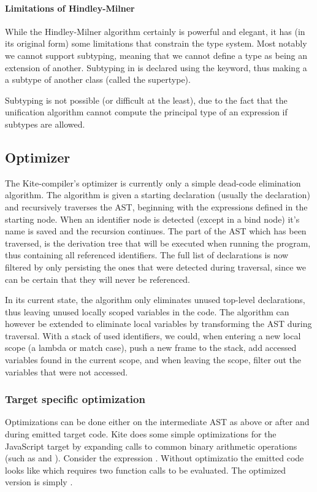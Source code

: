 \paragraph{Limitations of Hindley-Milner}
While the Hindley-Milner algorithm certainly is powerful and elegant, it has (in its original form) some limitations that constrain the type system. Most notably we cannot support subtyping, meaning that we cannot define a type as being an extension of another. Subtyping in  is declared using the  keyword, thus making a  a subtype of another class (called the supertype).

Subtyping is not possible (or difficult at the least), due to the fact that the unification algorithm cannot compute the principal type of an expression if subtypes are allowed.

\subsection{Optimizer}
\label{sec:impl-optimizer}
The Kite-compiler's optimizer is currently only a simple dead-code elimination algorithm. The algorithm is given a starting declaration (usually the  declaration) and recursively traverses the AST, beginning with the expressions defined in the starting node. When an identifier node is detected (except in a bind node) it's name is saved and the recursion continues. The part of the AST which has been traversed, is the derivation tree that will be executed when running the program, thus containing all referenced identifiers. The full list of declarations is now filtered by only persisting the ones that were detected during traversal, since we can be certain that they will never be referenced.

In its current state, the algorithm only eliminates unused top-level declarations, thus leaving unused locally scoped variables in the code. The algorithm can however be extended to eliminate local variables by transforming the AST during traversal. With a stack of used identifiers, we could, when entering a new local scope (a lambda or match case), push a new frame to the stack, add accessed variables found in the current scope, and when leaving the scope, filter out the variables that were not accessed.

\subsubsection{Target specific optimization}
Optimizations can be done either on the intermediate AST as above or after and during emitted target code. Kite does some simple optimizations for the JavaScript target by expanding calls to common binary arithmetic operations (such as \code{+} and \code{*}). Consider the expression . Without optimizatio the emitted code looks like  which  requires two function calls to be evaluated. The optimized version is simply .

